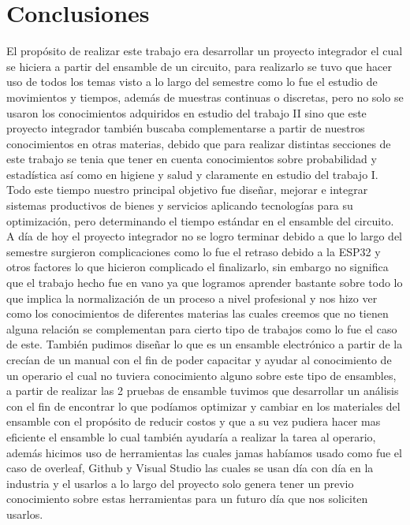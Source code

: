     
    
    \section{Conclusiones}
    El propósito de realizar este trabajo era desarrollar un proyecto integrador el cual se hiciera a partir del ensamble de un circuito, para realizarlo se tuvo que hacer uso de todos los temas visto a lo largo del semestre como lo fue el estudio de movimientos y tiempos, además de muestras continuas o discretas, pero no solo se usaron los conocimientos adquiridos en estudio del trabajo II sino que este proyecto integrador también buscaba complementarse a partir de nuestros conocimientos en otras materias, debido que para realizar distintas secciones de este trabajo se tenia que tener en cuenta conocimientos sobre probabilidad y estadística así como en higiene y salud y claramente en estudio del trabajo I.
    Todo este tiempo nuestro principal objetivo fue diseñar, mejorar e integrar sistemas productivos de bienes y servicios aplicando tecnologías para su optimización, pero determinando el tiempo estándar en el ensamble del circuito.
    A día de hoy el proyecto integrador no se logro terminar debido a que lo largo del semestre surgieron complicaciones como lo fue el retraso debido a la ESP32 y otros factores lo que hicieron complicado el finalizarlo, sin embargo no significa que el trabajo hecho fue en vano ya que logramos aprender bastante sobre todo lo que implica la normalización de un proceso a nivel profesional y nos hizo ver como los conocimientos de diferentes materias las cuales creemos que no tienen alguna relación se complementan para cierto tipo de trabajos como lo fue el caso de este. También pudimos diseñar lo que es un ensamble electrónico a partir de la crecían de un manual con el fin de poder capacitar y ayudar al conocimiento de un operario el cual no tuviera conocimiento alguno sobre este tipo de ensambles, a partir de realizar las 2 pruebas de ensamble tuvimos que desarrollar un análisis con el fin de encontrar lo que podíamos optimizar y cambiar en los materiales del ensamble con el propósito de reducir costos y que a su vez pudiera hacer mas eficiente el ensamble lo cual también ayudaría a realizar la tarea al operario, además hicimos uso de herramientas las cuales jamas habíamos usado como fue el caso de overleaf, Github y Visual Studio las cuales se usan día con día en la industria y el usarlos a lo largo del proyecto solo genera tener un previo conocimiento sobre estas herramientas para un futuro día que nos soliciten usarlos.
